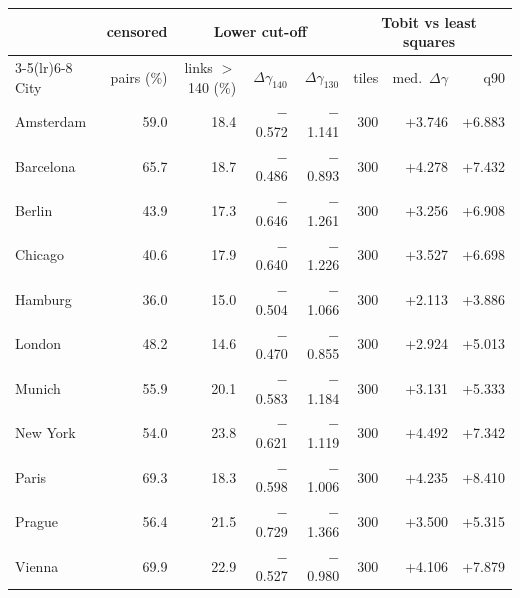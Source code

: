 \begin{tabular}{lrrrrrrr}
\toprule
& censored & \multicolumn{3}{c}{Lower cut-off} & \multicolumn{3}{c}{Tobit vs least squares} \\
\cmidrule(lr){3-5}\cmidrule(lr){6-8}
City & pairs (\%) & links $>$140 (\%) & $\Delta\gamma_{140}$ & $\Delta\gamma_{130}$ & tiles & med.\ $\Delta\gamma$ & q90 \\
\midrule
Amsterdam & 59.0 & 18.4 & \ensuremath{-}0.572 & \ensuremath{-}1.141 & 300 & +3.746 & +6.883 \\
Barcelona & 65.7 & 18.7 & \ensuremath{-}0.486 & \ensuremath{-}0.893 & 300 & +4.278 & +7.432 \\
Berlin & 43.9 & 17.3 & \ensuremath{-}0.646 & \ensuremath{-}1.261 & 300 & +3.256 & +6.908 \\
Chicago & 40.6 & 17.9 & \ensuremath{-}0.640 & \ensuremath{-}1.226 & 300 & +3.527 & +6.698 \\
Hamburg & 36.0 & 15.0 & \ensuremath{-}0.504 & \ensuremath{-}1.066 & 300 & +2.113 & +3.886 \\
London & 48.2 & 14.6 & \ensuremath{-}0.470 & \ensuremath{-}0.855 & 300 & +2.924 & +5.013 \\
Munich & 55.9 & 20.1 & \ensuremath{-}0.583 & \ensuremath{-}1.184 & 300 & +3.131 & +5.333 \\
New York & 54.0 & 23.8 & \ensuremath{-}0.621 & \ensuremath{-}1.119 & 300 & +4.492 & +7.342 \\
Paris & 69.3 & 18.3 & \ensuremath{-}0.598 & \ensuremath{-}1.006 & 300 & +4.235 & +8.410 \\
Prague & 56.4 & 21.5 & \ensuremath{-}0.729 & \ensuremath{-}1.366 & 300 & +3.500 & +5.315 \\
Vienna & 69.9 & 22.9 & \ensuremath{-}0.527 & \ensuremath{-}0.980 & 300 & +4.106 & +7.879 \\
\bottomrule
\end{tabular}
